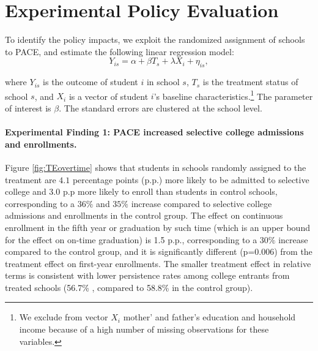 
\section{Experimental Policy Evaluation}\label{sec: findings}

To identify the policy impacts, we exploit the randomized assignment of schools to PACE, and estimate the following linear regression model:
\begin{equation}\label{eq:main_OLS}
	Y_{is}=\alpha+ \beta T_s + \lambda X_{i}+\eta_{is},
\end{equation}

\noindent where $Y_{is}$ is the outcome of student $i$ in school $s$, $T_s$ is the treatment status of school $s$, and $X_{i}$ is a vector of student $i$'s baseline characteristics.\footnote{We exclude from vector $X_i$ mother' and father's education and household income because of a high number of missing observations for these variables.} The parameter of interest is $\beta$. The standard errors are clustered at the school level.\par 


\paragraph{Experimental Finding 1: PACE increased selective college admissions and enrollments.} Figure \ref{fig:TEovertime} shows that students in schools randomly assigned to the treatment are $4.1$ percentage points (p.p.) more likely to be admitted to selective college and $3.0$ p.p more likely to enroll than students in control schools, corresponding to a $36\%$ and $35\%$ increase compared to selective college admissions and enrollments in the control group. The effect on continuous enrollment in the fifth year or graduation by such time (which is an upper bound for the effect on on-time graduation) is 1.5 p.p., corresponding to a $30 \%$ increase compared to the control group, and it is significantly different (p=0.006) from the treatment effect on first-year enrollments. The smaller treatment effect in relative terms is consistent with lower persistence rates among college entrants from treated schools (56.7\% , compared to 58.8\% in the control group).\par 

